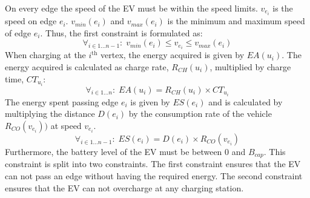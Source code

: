 On every edge the speed of the EV must be within the speed limits. $v_{e_i}$ is the speed on edge $e_i$. $v_{min}(e_i)$ and $v_{max}(e_i)$ is the minimum and maximum speed of edge $e_i$. Thus, the first constraint is formulated as:
\begin{equation*}
\forall_{i\in1 \dots n-1 }:\;v_{min}(e_i) \leq v_{e_i} \leq v_{max}(e_i)
\end{equation*}
When charging at the $i^{\text{th}}$ vertex, the energy acquired is given by $EA(u_i)$. The energy acquired is calculated as charge rate, $R_{CH}(u_i)$, multiplied by charge time, $CT_{u_i}$:
\begin{equation*}
\forall_{i\in1 \dots n }:\; EA(u_i) = R_{CH}(u_i) \times CT_{u_i}
\end{equation*}
The energy spent passing edge $e_i$ is given by $ES(e_i)$ and is calculated by multiplying the distance $D(e_i)$ by the consumption rate of the vehicle $R_{CO}(v_{e_i}))$ at speed $v_{e_i}$.
\begin{equation*}
\forall_{i\in1 \dots n-1 }:\; ES(e_i) = D(e_i) \times R_{CO}(v_{e_i})
\end{equation*}
Furthermore, the battery level of the EV must be between $0$ and $B_{cap}$.
This constraint is split into two constraints. The first constraint ensures that the EV can not pass an edge without having the required energy. The second constraint ensures that the EV can not overcharge at any charging station. 

